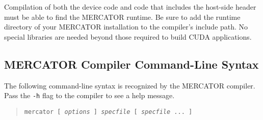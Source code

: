\documentclass[11pt]{article}
\begin{document}
Compilation of both the device code and code that includes the
host-side header must be able to find the MERCATOR runtime.  Be sure
to add the runtime directory of your MERCATOR installation to the
compiler's include path.  No special libraries are needed beyond those
required to build CUDA applications.

\subsection{MERCATOR Compiler Command-Line Syntax}

The following command-line syntax is recognized by the MERCATOR
compiler.  Pass the \texttt{-h} flag to the compiler to see a help
message.
\begin{quote}
\texttt{mercator [ \textit{options} ] \textit{specfile} [ \textit{specfile} ... ]}
\end{quote}
 
\end{document}
